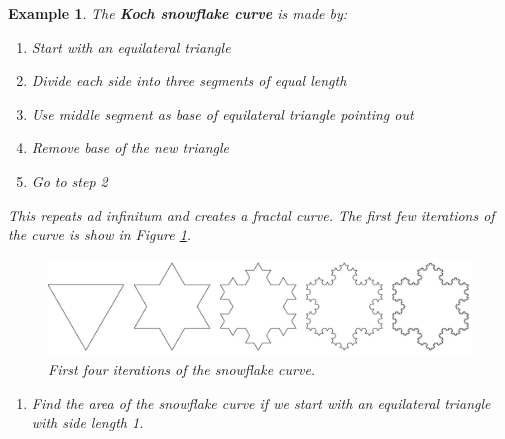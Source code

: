 \documentclass[letterpaper, 11pt, openany]{book}
\theoremstyle{mytheoremstyle}
\theoremstyle{myexamplestyle}
\newtheorem{example}{Example}[section]
\begin{document}
\begin{example}\label{e:seriesKochcurve}
    The \textbf{Koch snowflake curve} is made by:
    \begin{enumerate}
        \item Start with an equilateral triangle
        \item Divide each side into three segments of equal length
        \item Use middle segment as base of equilateral triangle pointing out
        \item Remove base of the new triangle
        \item Go to step 2
    \end{enumerate}
    This repeats ad infinitum and creates a fractal curve. The first few iterations of the curve is show in Figure \ref{f:snowflakes}.
    \begin{figure}[htbp]
        \centering
            \includegraphics[width=\textwidth]{Figures/snowflaskes.pdf}
        \caption{First four iterations of the snowflake curve.}
        \label{f:snowflakes}
    \end{figure}
    \begin{enumerate}
        \item Find the area of the snowflake curve if we start with an equilateral triangle with side length 1.        
        

\end{enumerate}
\end{example}
\end{document}
